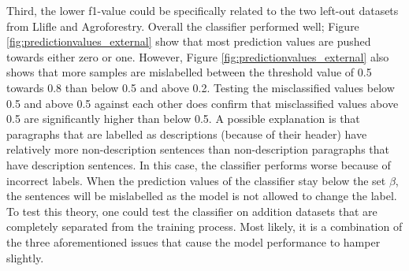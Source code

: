 \documentclass[a4paper, 12pt, oneside]{book} %
\begin{document}
Third, the lower f1-value could be specifically related to the two left-out datasets from Llifle and Agroforestry.
Overall the classifier performed well; Figure \ref{fig:predictionvalues_external} show that most prediction values are pushed towards either zero or one.
However, Figure \ref{fig:predictionvalues_external} also shows that more samples are mislabelled between the threshold value of 0.5 towards 0.8 than below 0.5 and above 0.2.
Testing the misclassified values below 0.5 and above 0.5 against each other does confirm that misclassified values above 0.5 are significantly higher than below 0.5.
A possible explanation is that paragraphs that are labelled as descriptions (because of their header) have relatively more non-description sentences than non-description paragraphs that have description sentences.
In this case, the classifier performs worse because of incorrect labels.
When the prediction values of the classifier stay below the set \(\beta\), the sentences will be mislabelled as the model is not allowed to change the label.
To test this theory, one could test the classifier on addition datasets that are completely separated from the training process.
Most likely, it is a combination of the three aforementioned issues that cause the model performance to hamper slightly.
\end{document}
